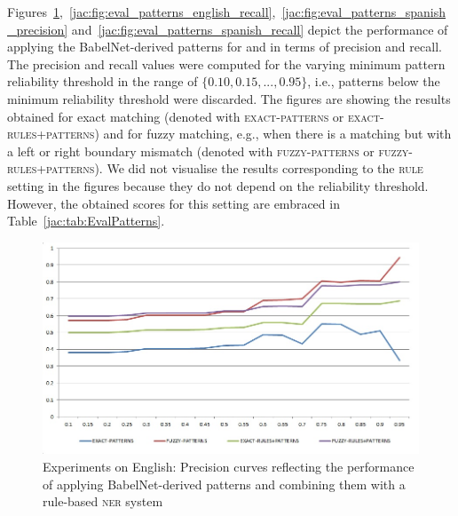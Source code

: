 \documentclass[output=paper]{langsci/langscibook}
\begin{document}
Figures~\ref{jac:fig:eval_patterns_english_precision},~\ref{jac:fig:eval_patterns_english_recall},~\ref{jac:fig:eval_patterns_spanish_precision}
and~\ref{jac:fig:eval_patterns_spanish_recall} depict the performance of applying the BabelNet-derived patterns for  and  
in terms of precision and recall. The precision and recall values were computed for the varying minimum pattern reliability threshold in the range of $\{0.10,0.15,...,0.95\}$, i.e., patterns below the minimum reliability threshold were discarded.
The figures are showing the results obtained for exact matching (denoted with \textsc{exact}-\textsc{patterns} or \textsc{exact}-\textsc{rules+patterns}) and for fuzzy matching, e.g., when there is a matching but with a left or right boundary mismatch (denoted with \textsc{fuzzy}-\textsc{patterns} or \textsc{fuzzy}-\textsc{rules+patterns}).
We did not visualise the results corresponding to the \textsc{rule} setting in the figures because they do not depend on the reliability threshold. However, the obtained scores for this setting are embraced in Table~\ref{jac:tab:EvalPatterns}.

\begin{figure}
\centering
\includegraphics[width=.95\textwidth]{figures/eval_patterns_English_precision.jpg}
\caption{Experiments on English: Precision curves reflecting the performance of applying BabelNet-derived patterns and combining them with a rule-based \textsc{ner} system}
\label{jac:fig:eval_patterns_english_precision}
\end{figure}
\end{document}
